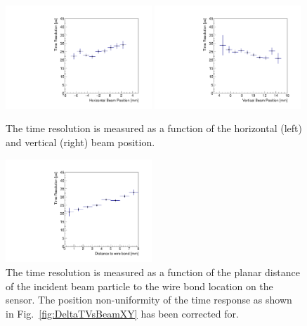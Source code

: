 \begin{figure}[htbp] 
\centering
\includegraphics[width=0.49\textwidth]{figures/TimeResolutionVsBeamHorizontalPosition.pdf} 
\includegraphics[width=0.49\textwidth]{figures/TimeResolutionVsBeamVerticalPosition.pdf} 
\caption{ The time resolution is measured as a function of the horizontal (left) and vertical (right)
beam position. }
\label{fig:TimeResolutionVsBeamXY} 
\end{figure} 


\begin{figure}[htbp]
\centering 
\includegraphics[width=0.49\textwidth]{figures/TimeResolutionVsR.pdf} 
\caption{ The time resolution is measured as a function of the planar distance of the 
incident beam particle to the wire bond location on the sensor. The position non-uniformity
of the time response as shown in Fig.~\ref{fig:DeltaTVsBeamXY} has been corrected for.}
\label{fig:TimeResolutionVsR}
\end{figure}




